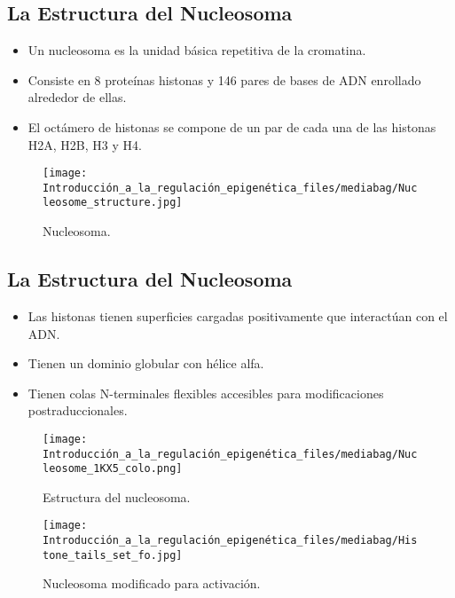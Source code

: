 \documentclass[
  letterpaper,
  DIV=11,
  numbers=noendperiod]{scrartcl}
\begin{document}
\subsection{La Estructura del
Nucleosoma}\label{la-estructura-del-nucleosoma}

\begin{itemize}
\item
  Un nucleosoma es la unidad básica repetitiva de la cromatina.
\item
  Consiste en 8 proteínas histonas y 146 pares de bases de ADN enrollado
  alrededor de ellas.
\item
  El octámero de histonas se compone de un par de cada una de las
  histonas H2A, H2B, H3 y H4.
\end{itemize}

\begin{figure}[H]

{\centering \texttt{[image: Introducción\_a\_la\_regulación\_epigenética\_files/mediabag/Nucleosome\_structure.jpg]}

}

\caption{Nucleosoma.}

\end{figure}%

\subsection{La Estructura del
Nucleosoma}\label{la-estructura-del-nucleosoma-1}

\begin{itemize}
\item
  Las histonas tienen superficies cargadas positivamente que interactúan
  con el ADN.
\item
  Tienen un dominio globular con hélice alfa.
\item
  Tienen colas N-terminales flexibles accesibles para modificaciones
  postraduccionales.
\end{itemize}

\begin{figure}[H]

{\centering \texttt{[image: Introducción\_a\_la\_regulación\_epigenética\_files/mediabag/Nucleosome\_1KX5\_colo.png]}

}

\caption{Estructura del nucleosoma.}

\end{figure}%
\begin{figure}[H]

{\centering \texttt{[image: Introducción\_a\_la\_regulación\_epigenética\_files/mediabag/Histone\_tails\_set\_fo.jpg]}

}

\caption{Nucleosoma modificado para activación.}

\end{figure}%
\end{document}
